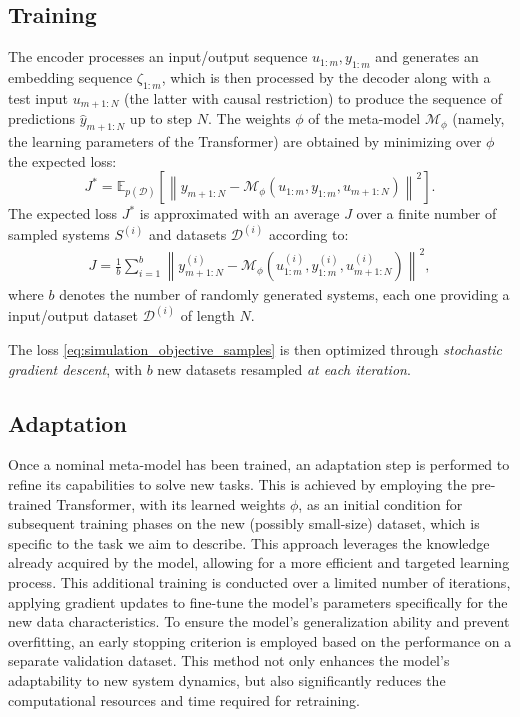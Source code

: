 \documentclass{ifacconf}
\newcommand{\sys}{S}
\newcommand{\free}{\mathcal{M}}
\newcommand{\D}{\mathcal{D}}
\newcommand{\nsamp}{N}
\newcommand{\norm}[1]{\left\lVert#1\right\rVert}
\newcommand{\E}{\mathbb{E}}
\begin{document}
\subsection{Training} \label{sec:training}
 The encoder processes an input/output sequence  
$u_{1:m}, y_{1:m}$  and generates an embedding sequence $\zeta_{1:{m}}$, which is then processed by the decoder along with a test input  $u_{m+1:\nsamp}$ (the latter with causal restriction) to produce the 
sequence of predictions $\hat y_{m+1:\nsamp}$ up to step $\nsamp$. The   weights $\phi$ of the meta-model $\free_{\phi}$ (namely, the learning parameters of the Transformer)  are obtained by minimizing over $\phi$  the expected loss:
\begin{equation}
\label{eq:simulation_objective}
     J^* = \E_{p(\D)} 
    \left [ 
    \norm{y_{m+1:\nsamp} -  \free_\phi (u_{1:m}, y_{1:m}, u_{m+1:\nsamp})
    }^2
    \right ].
\end{equation}
The expected loss $J^*$ is approximated with an average $J$ over a finite number of sampled systems $\sys^{(i)}$ and  datasets $\D^{(i)}$ according to:
\begin{multline}
	\label{eq:simulation_objective_samples}
    J = 
    \frac{1}{b}
    \sum_{i=1}^b
    \norm{y_{m+1:\nsamp}^{(i)} - \free_\phi (u_{1:m}^{(i)}, y_{1:m}^{(i)}, u_{m+1:\nsamp}^{(i)})}^2
    ,
\end{multline}
where   $b$ denotes the number of randomly generated systems, each one providing a  input/output dataset  $\D^{(i)}$ of length $N$. 

The loss \eqref{eq:simulation_objective_samples} is then optimized through 
\emph{stochastic gradient descent},  with  $b$ new datasets resampled \emph{at each iteration}.

\subsection{Adaptation}

Once a nominal meta-model has been trained, %
an adaptation step is performed to refine its capabilities to solve new tasks. This is achieved by employing the pre-trained Transformer, with its learned weights $\phi$, as an initial condition for subsequent training phases on the new (possibly small-size) dataset, which is specific to the task we aim to describe. This approach leverages the knowledge already acquired by the model, allowing for a more efficient and targeted learning process. This additional training is conducted over a limited number of iterations, applying gradient updates to fine-tune the model's parameters specifically for the new data characteristics. To ensure the model's generalization ability and prevent overfitting,  an early stopping criterion is employed  based on the performance on a separate validation dataset. This method not only enhances the model's adaptability to new system dynamics, but also significantly reduces the computational resources and time required for retraining.
\end{document}
